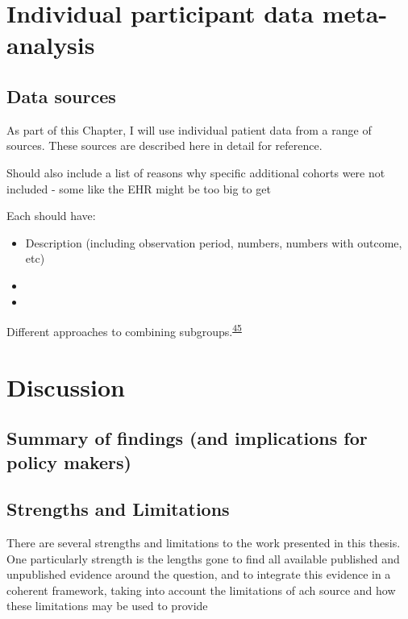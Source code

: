 \documentclass[a4paper, twoside]{templates/ociamthesis}
\begin{document}
\hypertarget{ipd-heading}{%
\chapter{Individual participant data meta-analysis}\label{ipd-heading}}

\minitoc 

\hypertarget{data-sources}{%
\section{Data sources}\label{data-sources}}

As part of this Chapter, I will use individual patient data from a range of sources. These sources are described here in detail for reference.

Should also include a list of reasons why specific additional cohorts were not included - some like the EHR might be too big to get

Each should have:

\begin{itemize}
\item
  Description (including observation period, numbers, numbers with outcome, etc)
\item
\item
\end{itemize}

Different approaches to combining subgroups.\textsuperscript{\protect\hyperlink{ref-fisher2017}{45}}

\hypertarget{discussion-heading}{%
\chapter{Discussion}\label{discussion-heading}}

\hypertarget{summary-of-findings-and-implications-for-policy-makers}{%
\section{Summary of findings (and implications for policy makers)}\label{summary-of-findings-and-implications-for-policy-makers}}

\hypertarget{strengths-and-limitations-1}{%
\section{Strengths and Limitations}\label{strengths-and-limitations-1}}

There are several strengths and limitations to the work presented in this thesis. One particularly strength is the lengths gone to find all available published and unpublished evidence around the question, and to integrate this evidence in a coherent framework, taking into account the limitations of ach source and how these limitations may be used to provide
\end{document}
